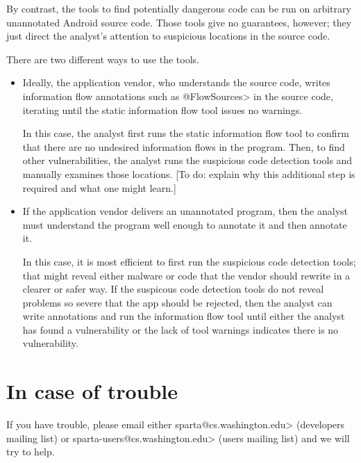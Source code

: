 By contrast, the tools to find potentially dangerous code can be run on
arbitrary unannotated Android source code.  Those tools give no guarantees,
however; they just direct the analyst's attention to suspicious locations
in the source code.


There are two different ways to use the tools.
\begin{itemize}
\item
  Ideally, the application vendor, who understands the source code,
  writes information flow annotations such as \<@FlowSources> in the source
  code, iterating until the static information flow tool issues no warnings.

  In this case, the analyst first runs the static information flow tool to
  confirm that there are no undesired information flows in the program.
  Then, to find other vulnerabilities, the analyst runs the suspicious code
  detection tools and manually examines those locations.
  [To do:  explain why this additional step is required and what one might
  learn.]

\item
  If the application vendor delivers an unannotated program, then the
  analyst must understand the program well enough to annotate it and then
  annotate it.

  In this case, it is most efficient to first run the suspicious code
  detection tools; that might reveal either malware or code that the vendor
  should rewrite in a clearer or safer way.  If the suspicous code
  detection tools do not reveal problems so severe that the app should be
  rejected, then the analyst can write annotations and run the information
  flow tool until either the analyst has found a vulnerability or the lack
  of tool warnings indicates there is no vulnerability.
\end{itemize}


\section{In case of trouble\label{sec:incaseoftrouble}}

\begin{sloppypar}
If you have trouble, please email either
\<sparta@cs.washington.edu>
(developers mailing list) or
\<sparta-users@cs.washington.edu> (users
mailing list) and we will try to help.
\end{sloppypar}





